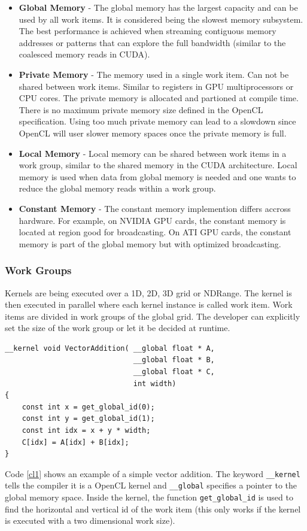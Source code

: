 \begin{itemize}
\item{{\bf Global Memory} - The global memory has the largest capacity and can be used by all work items. It is considered being the slowest memory subsystem. The best performance is achieved when streaming contiguous memory addresses or patterns that can explore the full bandwidth (similar to the coalesced memory reads in CUDA). }
\item{{\bf Private Memory} - The memory used in a single work item. Can not be shared between work items. Similar to registers in GPU multiprocessors or CPU cores. The private memory is allocated and partioned at compile time. There is no maximum private memory size defined  in the OpenCL specification. Using too much private memory can lead to a slowdown since OpenCL will user slower memory spaces once the private memory is full.}
\item{{\bf Local Memory} - Local memory can be shared between work items in a work group, similar to the shared memory in the CUDA architecture. Local memory is used when data from global memory is needed and one wants to reduce the global memory reads within a work group.}
\item{{\bf Constant Memory} - The constant memory implemention differs accross hardware. For example, on NVIDIA GPU cards, the constant memory is located at region good for broadcasting. On ATI GPU cards, the constant memory is part of the global memory but with optimized broadcasting.}
\end{itemize}

\subsubsection{Work Groups}

Kernels are being executed over a 1D, 2D, 3D grid or NDRange. The kernel is then executed in parallel where each kernel instance is called work item. Work items are divided in work groups of the global grid. The developer can explicitly set the size of the work group or let it be decided at runtime.

\renewcommand{\lstlistingname}{Code}
\begin{lstlisting}[caption= Example of vector addition in OpenCL, label=cl1]
__kernel void VectorAddition( __global float * A,
                              __global float * B,
                              __global float * C,
                              int width)
{ 
    const int x = get_global_id(0); 
    const int y = get_global_id(1); 
    const int idx = x + y * width;
    C[idx] = A[idx] + B[idx];
}
\end{lstlisting}

Code \ref{cl1} shows an example of a simple vector addition. The keyword \texttt{\_\_kernel} tells the compiler it is a OpenCL kernel and \texttt{\_\_global} specifies a pointer to the global memory space. Inside the kernel, the function \texttt{get\_global\_id} is used to find the horizontal and vertical id of the work item (this only works if the kernel is executed with a two dimensional work size).
